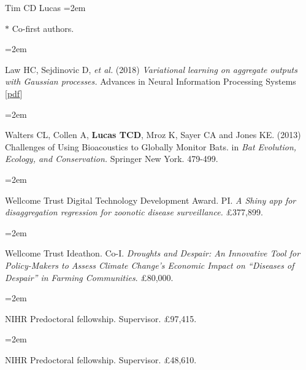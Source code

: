 \documentclass{scrartcl}
\newcommand{\MarginText}[1]{\marginpar{\raggedleft\itshape\small#1}} %
\newcommand{\Description}[1]{\hangindent=2em\hangafter=0\noindent\raggedright\footnotesize{#1}\par\normalsize\vspace{1em}} %
\begin{document}
\begin{cv}{Tim {\Large CD} Lucas}
\Description{\MarginText{} \scriptsize{ $\ast$ Co-first authors. } }



{\color{Maroon}}\vspace{1em}


\Description{\MarginText{2018}Law HC, Sejdinovic D, \emph{et al.} (2018) \emph{Variational learning on aggregate outputs with Gaussian processes.} Advances in Neural Information Processing Systems [\href{http://papers.nips.cc/paper/7847-variational-learning-on-aggregate-outputs-with-gaussian-processes.pdf}{pdf}]}

\Description{\MarginText{2013}Walters CL, Collen A, \textbf{Lucas TCD}, Mroz K, Sayer CA and Jones KE. (2013) Challenges of Using Bioacoustics to Globally Monitor Bats. in \emph{Bat Evolution, Ecology, and Conservation.} Springer New York. 479-499.}

\vspace{1em} %




{\color{Maroon}}\vspace{1em}  %



\Description{\MarginText{2023}Wellcome Trust Digital Technology Development Award. PI. \emph{A Shiny app for disaggregation regression for zoonotic disease surveillance.} £377,899.}
\vspace{-0.5em} %


\Description{Wellcome Trust Ideathon. Co-I. \emph{Droughts and Despair: An Innovative Tool for Policy-Makers to Assess Climate Change's Economic Impact on “Diseases of Despair” in Farming Communities}. £80,000.}
\vspace{-0.5em} %

\Description{NIHR Predoctoral fellowship. Supervisor. £97,415.}
\vspace{-0.5em} %

\Description{NIHR Predoctoral fellowship. Supervisor. £48,610.}
\vspace{-0.5em} %


\end{cv}
\end{document}
